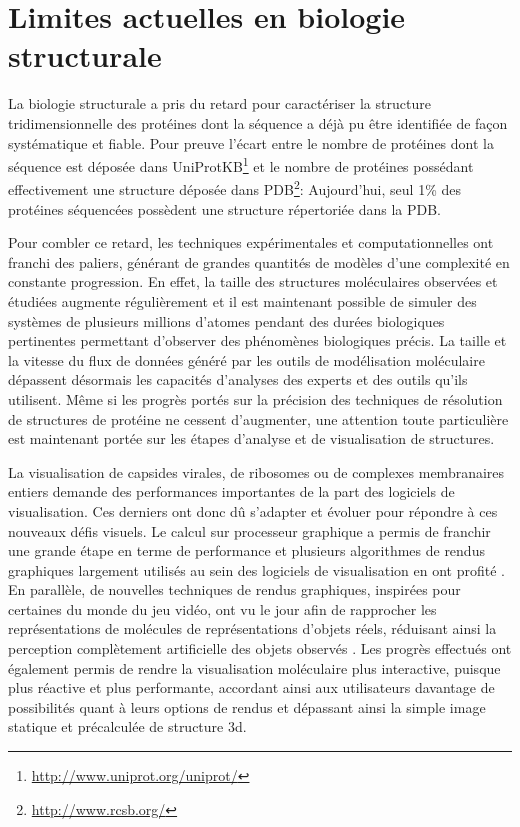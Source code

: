 \section{Limites actuelles en biologie structurale}

La biologie structurale a pris du retard pour caractériser la structure tridimensionnelle des protéines dont la séquence a déjà pu être identifiée de façon systématique et fiable. Pour preuve l'écart entre le nombre de protéines dont la séquence est déposée dans UniProtKB\footnote{\url{http://www.uniprot.org/uniprot/}} et le nombre de protéines possédant effectivement une structure déposée dans PDB\footnote{\url{http://www.rcsb.org/}}: Aujourd'hui, seul 1\% des protéines séquencées possèdent une structure répertoriée dans la PDB. 

Pour combler ce retard, les techniques expérimentales et computationnelles ont franchi des paliers, générant de grandes quantités de modèles d'une complexité en constante progression. En effet, la taille des structures moléculaires observées et étudiées augmente régulièrement et il est maintenant possible de simuler des systèmes de plusieurs millions d'atomes pendant des durées biologiques pertinentes permettant d'observer des phénomènes biologiques précis. La taille et la vitesse du flux de données généré par les outils de modélisation moléculaire dépassent désormais les capacités d'analyses des experts et des outils qu'ils utilisent. Même si les progrès portés sur la précision des techniques de résolution de structures de protéine ne cessent d'augmenter, une attention toute particulière est maintenant portée sur les étapes d'analyse et de visualisation de structures.

La visualisation de capsides virales, de ribosomes ou de complexes membranaires entiers demande des performances importantes de la part des logiciels de visualisation. Ces derniers ont donc dû s'adapter et évoluer pour répondre à ces nouveaux défis visuels. Le calcul sur processeur graphique a permis de franchir une grande étape en terme de performance et plusieurs algorithmes de rendus graphiques largement utilisés au sein des logiciels de visualisation en ont profité \cite{chavent_gpu-powered_2011}. En parallèle, de nouvelles techniques de rendus graphiques, inspirées pour certaines du monde du jeu vidéo, ont vu le jour afin de rapprocher les représentations de molécules de représentations d'objets réels, réduisant ainsi la perception complètement artificielle des objets observés \cite{lv_game_2013}. Les progrès effectués ont également permis de rendre la visualisation moléculaire plus interactive, puisque plus réactive et plus performante, accordant ainsi aux utilisateurs davantage de possibilités quant à leurs options de rendus et dépassant ainsi la simple image statique et précalculée de structure 3d.

